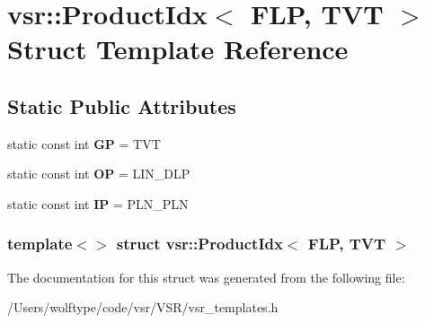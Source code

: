 \hypertarget{structvsr_1_1_product_idx_3_01_f_l_p_00_01_t_v_t_01_4}{\section{vsr\-:\-:Product\-Idx$<$ F\-L\-P, T\-V\-T $>$ Struct Template Reference}
\label{structvsr_1_1_product_idx_3_01_f_l_p_00_01_t_v_t_01_4}
}
\subsection*{Static Public Attributes}
\begin{DoxyCompactItemize}
\item 
\hypertarget{structvsr_1_1_product_idx_3_01_f_l_p_00_01_t_v_t_01_4_a81c36df7e75b854f9005615b91f2165d}{static const int {\bfseries G\-P} = T\-V\-T}\label{structvsr_1_1_product_idx_3_01_f_l_p_00_01_t_v_t_01_4_a81c36df7e75b854f9005615b91f2165d}

\item 
\hypertarget{structvsr_1_1_product_idx_3_01_f_l_p_00_01_t_v_t_01_4_af321baad7ace626a330cb11c88cdca27}{static const int {\bfseries O\-P} = L\-I\-N\-\_\-\-D\-L\-P}\label{structvsr_1_1_product_idx_3_01_f_l_p_00_01_t_v_t_01_4_af321baad7ace626a330cb11c88cdca27}

\item 
\hypertarget{structvsr_1_1_product_idx_3_01_f_l_p_00_01_t_v_t_01_4_afb8a89627ec4bb8267f8a8c830e3b9b4}{static const int {\bfseries I\-P} = P\-L\-N\-\_\-\-P\-L\-N}\label{structvsr_1_1_product_idx_3_01_f_l_p_00_01_t_v_t_01_4_afb8a89627ec4bb8267f8a8c830e3b9b4}

\end{DoxyCompactItemize}
\subsubsection*{template$<$$>$ struct vsr\-::\-Product\-Idx$<$ F\-L\-P, T\-V\-T $>$}



The documentation for this struct was generated from the following file\-:\begin{DoxyCompactItemize}
\item 
/\-Users/wolftype/code/vsr/\-V\-S\-R/vsr\-\_\-templates.\-h\end{DoxyCompactItemize}
